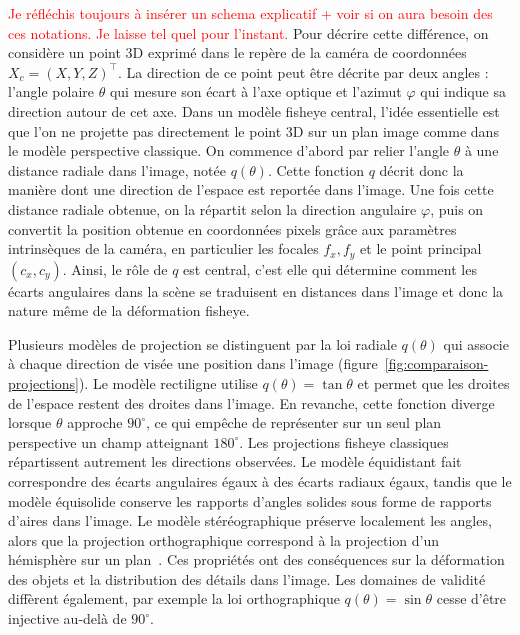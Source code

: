\documentclass[11pt,a4paper]{article}
\begin{document}
\textcolor{red}{Je réfléchis toujours à insérer un schema explicatif + voir si on aura besoin des ces notations. Je laisse tel quel pour l'instant.}
Pour décrire cette différence, on considère un point 3D exprimé dans le repère de la caméra de coordonnées $X_c=(X,Y,Z)^\top$. La direction de ce point peut être décrite par deux angles : l'angle polaire $\theta$ qui mesure son écart à l'axe optique et l'azimut $\varphi$ qui indique sa direction autour de cet axe. Dans un modèle fisheye central, l'idée essentielle est que l'on ne projette pas directement le point 3D sur un plan image comme dans le modèle perspective classique. On commence d'abord par relier l'angle $\theta$ à une distance radiale dans l'image, notée $q(\theta)$.
Cette fonction $q$ décrit donc la manière dont une direction de l'espace est reportée dans l'image. Une fois cette distance radiale obtenue, on la répartit selon la direction angulaire $\varphi$, puis on convertit la position obtenue en coordonnées pixels grâce aux paramètres intrinsèques de la caméra, en particulier les focales $f_x,f_y$ et le point principal $(c_x,c_y)$. Ainsi, le rôle de $q$ est central, c'est elle qui détermine comment les écarts angulaires dans la scène se traduisent en distances dans l'image et donc la nature même de la déformation fisheye.


Plusieurs modèles de projection se distinguent par la loi radiale $q(\theta)$ qui associe à chaque direction de visée une position dans l'image (figure~\ref{fig:comparaison-projections}). Le modèle rectiligne utilise $q(\theta)=\tan\theta$ et permet que les droites de l'espace restent des droites dans l'image. En revanche, cette fonction diverge lorsque $\theta$ approche $90^\circ$, ce qui empêche de représenter sur un seul plan perspective un champ atteignant $180^\circ$. Les projections fisheye classiques répartissent autrement les directions observées. Le modèle équidistant fait correspondre des écarts angulaires égaux à des écarts radiaux égaux, tandis que le modèle équisolide conserve les rapports d'angles solides sous forme de rapports d'aires dans l'image. Le modèle stéréographique préserve localement les angles, alors que la projection orthographique correspond à la projection d'un hémisphère sur un plan~\cite{schneider2009,yogamani2019}. Ces propriétés ont des conséquences sur la déformation des objets et la distribution des détails dans l'image. Les domaines de validité diffèrent également, par exemple la loi orthographique $q(\theta)=\sin\theta$ cesse d'être injective au-delà de $90^\circ$.
\end{document}
